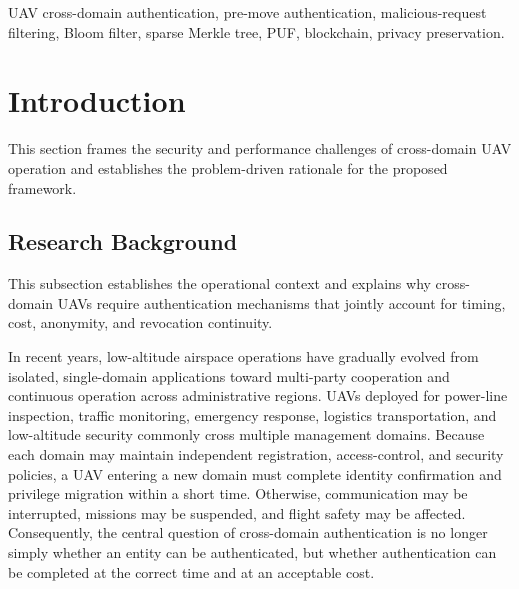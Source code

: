 \documentclass[lettersize,journal]{IEEEtran}
\begin{document}
\begin{abstract}
authentication, hierarchical filtering, formal authentication, behavior monitoring, precise revocation, and hardware-level anti-washing protection, providing an implementable security framework for long-distance inspection, logistics delivery, and cross-domain low-altitude security operations.
	\end{abstract}
	
	\begin{IEEEkeywords}
		UAV cross-domain authentication, pre-move authentication, malicious-request filtering, Bloom filter, sparse Merkle tree, PUF, blockchain, privacy preservation.
	\end{IEEEkeywords}
	
	\section{Introduction}
	This section frames the security and performance challenges of cross-domain UAV operation and establishes the problem-driven rationale for the proposed framework.
	
	
	\subsection{Research Background}
	This subsection establishes the operational context and explains why cross-domain UAVs require authentication mechanisms that jointly account for timing, cost, anonymity, and revocation continuity.
	
	
	In recent years, low-altitude airspace operations have gradually evolved from isolated, single-domain applications toward multi-party cooperation and continuous operation across administrative regions. UAVs deployed for power-line inspection, traffic monitoring, emergency response, logistics transportation, and low-altitude security commonly cross multiple management domains. Because each domain may maintain independent registration, access-control, and security policies, a UAV entering a new domain must complete identity confirmation and privilege migration within a short time. Otherwise, communication may be interrupted, missions may be suspended, and flight safety may be affected. Consequently, the central question of cross-domain authentication is no longer simply whether an entity can be authenticated, but whether authentication can be completed at the correct time and at an acceptable cost.
	
\end{document}
